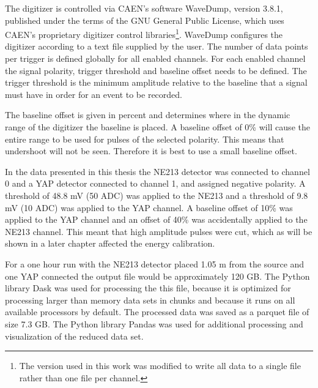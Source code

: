 \documentclass[main.tex]{subfiles}
\begin{document}
The digitizer is controlled via CAEN's software WaveDump, version 3.8.1, published under the terms of the GNU General Public License\cite{WaveDump}, which uses CAEN's proprietary digitizer control libraries\footnote{The version used in this work was modified to write all data to a single file rather than one file per channel.}. WaveDump configures the digitizer according to a text file supplied by the user. The number of data points per trigger is defined globally for all enabled channels. For each enabled channel the signal polarity, trigger threshold and baseline offset needs to be defined. The trigger threshold is the minimum amplitude relative to the baseline that a signal must have in order for an event to be recorded. 

The baseline offset is given in percent and determines where in the dynamic range of the digitizer the baseline is placed. A baseline offset of 0\% will cause the entire range to be used for pulses of the selected polarity. This means that undershoot will not be seen. Therefore it is best to use a small baseline offset.

In the data presented in this thesis the NE213 detector was connected to channel 0 and a YAP detector connected to channel 1, and assigned negative polarity. A threshold of 48.8 mV (50 ADC) was applied to the NE213 and a threshold of 9.8 mV (10 ADC) was applied to the YAP channel. A baseline offset of 10\% was applied to the YAP channel and an offset of 40\% was accidentally applied to the NE213 channel. This meant that high amplitude pulses were cut, which as will be shown in a later chapter affected the energy calibration.

For a one hour run with the NE213 detector placed 1.05 m from the source and one YAP connected the output file would be approximately 120 GB. The Python library Dask was used for processing the this file, because it is optimized for processing larger than memory data sets in chunks and because it runs on all available processors by default\cite{Dask}. The processed data was saved as a parquet file of size 7.3 GB. The Python library Pandas was used for additional processing and visualization of the reduced data set\cite{Pandas}.
\end{document}
